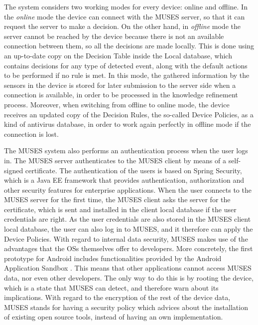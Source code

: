 The system considers two working modes for every device: online and offline. In the \textit{online} mode the device can connect with the MUSES server, so that it can request the server to make a decision. On the other hand, in \textit{offline} mode the server cannot be reached by the device because there is not an available connection between them, so all the decisions are made locally.
This is done using an up-to-date copy on the Decision Table inside the Local database, which contains decisions for any type of detected event, along with the default actions to be performed if no rule is met. In this mode, the gathered information by the sensors in the device is stored for later submission to the server side when a connection is available, in order to be processed in the knowledge refinement process.
Moreover, when switching from offline to online mode, the device receives an updated copy of the Decision Rules, the so-called Device Policies, as a kind of antivirus database, in order to work again perfectly in offline mode if the connection is lost.

The MUSES system also performs an authentication process when the user logs in. The MUSES server authenticates to the MUSES client by means of a self-signed certificate. The authentication of the users is based on Spring Security, which is a Java EE framework that provides authentication, authorization and other security features for enterprise applications. When the user connects to the MUSES server for the first time, the MUSES client asks the server for the certificate, which is sent and installed in the client local database if the user credentials are right. As the user credentials are also stored in the MUSES client local database, the user can also log in to MUSES, and it therefore can apply the Device Policies. With regard to internal data security, MUSES makes use of the advantages that the OSs themselves offer to developers. More concretely, the first prototype for Android includes functionalities provided by the Android Application Sandbox \cite{blasing2010android}. This means that other applications cannot access MUSES data, nor even other developers. The only way to do this is by rooting the device, which is a state that MUSES can detect, and therefore warn about its implications. With regard to the encryption of the rest of the device data, MUSES stands for having a security policy which advices about the installation of existing open source tools, instead of having an own implementation.


